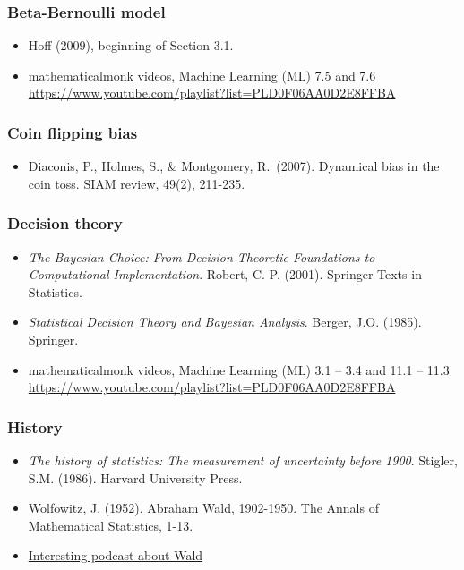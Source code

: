 \documentclass[12pt]{article}
\begin{document}
\subsubsection*{Beta-Bernoulli model}
\begin{itemize}
\item Hoff (2009), beginning of Section 3.1.
\item mathematicalmonk videos, Machine Learning (ML) 7.5 and 7.6 \\ 
    \url{https://www.youtube.com/playlist?list=PLD0F06AA0D2E8FFBA}
\end{itemize}

\subsubsection*{Coin flipping bias}
\begin{itemize}
\item Diaconis, P., Holmes, S., \& Montgomery, R.\ (2007). Dynamical bias in the coin toss. SIAM review, 49(2), 211-235.
\end{itemize}

\subsubsection*{Decision theory}
\begin{itemize}
\item \textit{The Bayesian Choice: From Decision-Theoretic Foundations to Computational Implementation}. Robert, C. P. (2001). Springer Texts in Statistics.
\item \textit{Statistical Decision Theory and Bayesian Analysis}. Berger, J.O. (1985). Springer.
\item mathematicalmonk videos, Machine Learning (ML) 3.1 -- 3.4 and 11.1 -- 11.3 \\ 
    \url{https://www.youtube.com/playlist?list=PLD0F06AA0D2E8FFBA}
\end{itemize}

\subsubsection*{History}
\begin{itemize}
\item \textit{The history of statistics: The measurement of uncertainty before 1900}. Stigler, S.M. (1986). Harvard University Press.
\item Wolfowitz, J. (1952). Abraham Wald, 1902-1950. The Annals of Mathematical Statistics, 1-13.
\item \href{http://youarenotsosmart.com/2014/04/24/yanss-podcast-022-how-we-miss-what-is-missing-and-what-to-do-about-it-with-statistician-megan-price/}{Interesting podcast about Wald}
\end{itemize}
\end{document}
